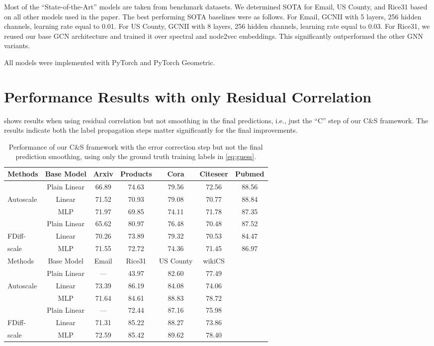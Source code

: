 \documentclass{article}
\newcommand{\framework}{C\&S}
\begin{document}
Most of the ``State-of-the-Art'' models are taken from benchmark datasets.
We determined SOTA for Email, US County, and Rice31 based on all other models used in the paper.
The best performing SOTA baselines were as follows.
For Email, GCNII with 5 layers, 256 hidden channels, learning rate equal to 0.01. 
For US County, GCNII with 8 layers, 256 hidden channels, learning rate equal to 0.03. 
For Rice31, we reused our base GCN architecture and trained it over spectral and node2vec embeddings.
This significantly outperformed the other GNN variants.

All models were implemented with PyTorch\citep{pytorch} and PyTorch Geometric\citep{fey2019fast}.

\section{Performance Results with only Residual Correlation}

 shows results when using residual correlation but not smoothing in the final predictions, i.e., just the ``C'' step of our \framework{} framework.
The results indicate both the label propagation steps matter significantly for the final improvements.

\begin{table}[t]
\caption{Performance of our C\&S framework with the error correction step but not the final prediction smoothing,
using only the ground truth training labels in \cref{eq:guess}.}\label{tab:rc_step}
\vspace{-\baselineskip}
\begin{center}
\begin{tabular}{lcccccc}
\toprule
Methods &  Base Model  & Arxiv & Products & Cora & Citeseer &  Pubmed\\ 
\midrule
 & Plain Linear& 66.89 & 74.63 & 79.56 & 72.56 & 88.56 \\
 Autoscale & Linear & 71.52 & 70.93 & 79.08 & 70.77 & 88.84 \\
 & MLP & 71.97 & 69.85 & 74.11 & 71.78 & 87.35  \\
  \midrule   
& Plain Linear& 65.62 & 80.97 & 76.48 & 70.48 & 87.52 \\
FDiff-  & Linear& 70.26 & 73.89 & 79.32 & 70.53 & 84.47  \\
scale& MLP& 71.55 & 72.72 & 74.36 & 71.45 &  86.97  \\
\midrule
Methods &  Base Model  & Email & Rice31 &  US County & wikiCS\\ 
\midrule
&Plain Linear &	--- & 43.97 & 82.60 & 77.49\\
 Autoscale  &Linear	& 73.39 & 86.19 & 84.08 & 74.06\\
&MLP	& 71.64 & 84.61 & 88.83 & 78.72\\
  \midrule
 & Plain Linear & --- & 72.44 & 87.16 & 75.98 \\
 FDiff-  & Linear& 71.31 & 85.22 & 88.27  & 73.86 \\
scale& MLP& 72.59 & 85.42 & 89.62 & 78.40 \\
\bottomrule
\end{tabular}
\end{center}
\end{table}
\end{document}
